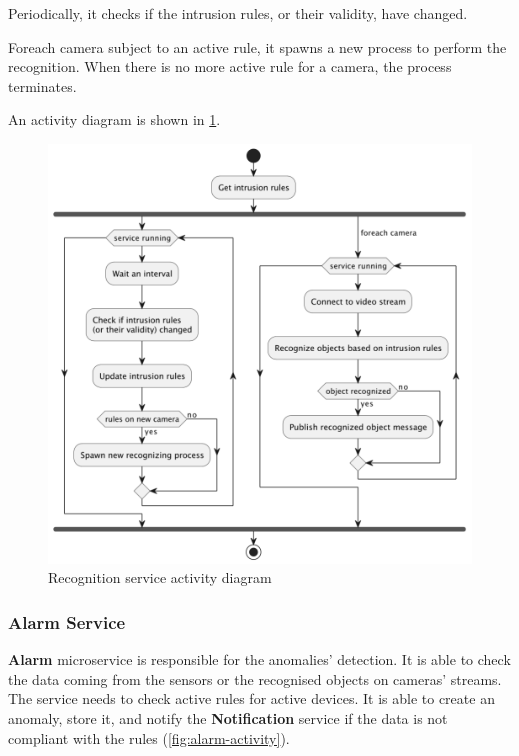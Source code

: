 \documentclass{scrartcl}
\begin{document}
    Periodically, it checks if the intrusion rules, or their validity, have changed.

    Foreach camera subject to an active rule, it spawns a new process to perform the recognition.
    When there is no more active rule for a camera, the process terminates.

    An activity diagram is shown in \cref{fig:recognition-activity}.

    \begin{figure}
        \centering
        \includegraphics[scale=0.6]{img/recognition-activity}
        \caption{Recognition service activity diagram}
        \label{fig:recognition-activity}
    \end{figure}


    \subsubsection{Alarm Service}

    \textbf{Alarm} microservice is responsible for the anomalies' detection.
    It is able to check the data coming from the sensors or the recognised objects on cameras' streams.
    The service needs to check active rules for active devices.
    It is able to create an anomaly, store it, and notify the \textbf{Notification} service if the data is not compliant with the rules (\cref{fig:alarm-activity}).
\end{document}
